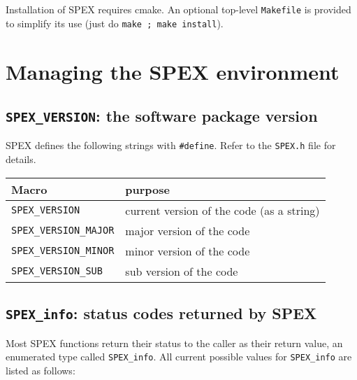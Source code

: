\documentclass[12pt]{report}
\theoremstyle{definition}
\begin{document}
Installation of SPEX requires cmake.  An optional top-level \verb'Makefile'
is provided to simplify its use (just do \verb'make ; make install').

\newpage
\section{Managing the SPEX environment} \label{s:user:setup}

\cprotect\subsection{\verb|SPEX_VERSION|: the software package version}

SPEX defines the following strings with \verb|#define|. Refer to
the \verb|SPEX.h| file for details.

\begin{center}
\begin{tabular}{ll}
\hline
Macro & purpose \\
\hline
\verb|SPEX_VERSION|       & current version of the code (as a string)\\
\verb|SPEX_VERSION_MAJOR| & major version of the code\\
\verb|SPEX_VERSION_MINOR| & minor version of the code   \\
\verb|SPEX_VERSION_SUB|   & sub version of the code\\
\hline
\end{tabular}
\end{center}

\cprotect\subsection{\verb|SPEX_info|: status codes returned by SPEX}
\label{ss:SPEX_info}

Most SPEX functions return their status to the caller as their return value,
an enumerated type called \verb|SPEX_info|. All current possible values for
\verb|SPEX_info| are listed as follows:
\end{document}
